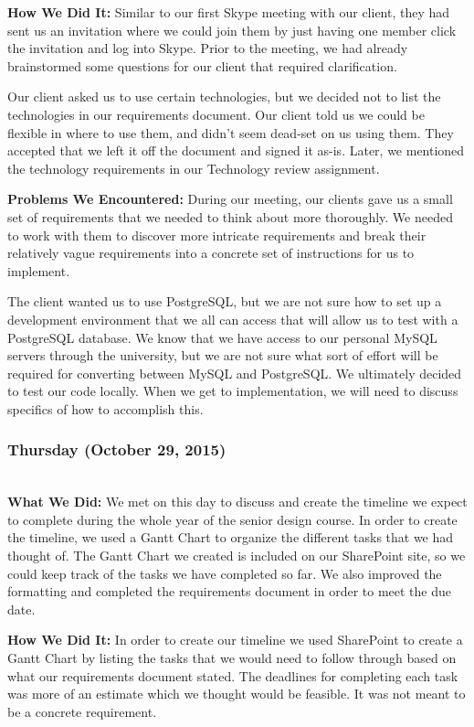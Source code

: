 \documentclass[onecolumn]{IEEEtran}
\begin{document}
    \textbf{How We Did It: } 
    Similar to our first Skype meeting with our client, they had sent us an invitation where we could join them by just having one member click the invitation and log into Skype. Prior to the meeting, we had already brainstormed some questions for our client that required clarification.  

    Our client asked us to use certain technologies, but we decided not to list the technologies in our requirements document. Our client told us we could be flexible in where to use them, and didn't seem dead-set on us using them. They accepted that we left it off the document and signed it as-is. Later, we mentioned the technology requirements in our Technology review assignment.  
    
    \textbf{Problems We Encountered: } 
    During our meeting, our clients gave us a small set of requirements that we needed to think about more thoroughly. We needed to work with them to discover more intricate requirements and break their relatively vague requirements into a concrete set of instructions for us to implement.  

    The client wanted us to use PostgreSQL, but we are not sure how to set up a development environment that we all can access that will allow us to test with a PostgreSQL database. We know that we have access to our personal MySQL servers through the university, but we are not sure what sort of effort will be required for converting between MySQL and PostgreSQL. We ultimately decided to test our code locally. When we get to implementation, we will need to discuss specifics of how to accomplish this.  

\subsubsection{Thursday (October 29, 2015)} \hspace*{\fill} \\  
    \textbf{What We Did: }
    We met on this day to discuss and create the timeline we expect to complete during the whole year of the senior design course. In order to create the timeline, we used a Gantt Chart to organize the different tasks that we had thought of. The Gantt Chart we created is included on our SharePoint site, so we could keep track of the tasks we have completed so far. We also improved the formatting and completed the requirements document in order to meet the due date.  
    
    \textbf{How We Did It: } 
    In order to create our timeline we used SharePoint to create a Gantt Chart by listing the tasks that we would need to follow through based on what our requirements document stated. The deadlines for completing each task was more of an estimate which we thought would be feasible. It was not meant to be a concrete requirement.  
    
\end{document}
